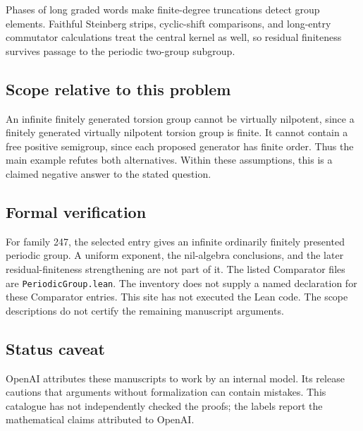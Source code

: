 \documentclass[11pt]{article}
\begin{document}
Phases of long graded words make finite-degree truncations detect group elements. Faithful Steinberg strips, cyclic-shift comparisons, and long-entry commutator calculations treat the central kernel as well, so residual finiteness survives passage to the periodic two-group subgroup.

\subsection{Scope relative to this problem}
An infinite finitely generated torsion group cannot be virtually nilpotent, since a finitely generated virtually nilpotent torsion group is finite. It cannot contain a free positive semigroup, since each proposed generator has finite order. Thus the main example refutes both alternatives. Within these assumptions, this is a claimed negative answer to the stated question.

\subsection{Formal verification}
For family 247, the selected entry gives an infinite ordinarily finitely presented periodic group. A uniform exponent, the nil-algebra conclusions, and the later residual-finiteness strengthening are not part of it. The listed Comparator files are \texttt{PeriodicGroup.lean}. The inventory does not supply a named declaration for these Comparator entries. This site has not executed the Lean code. The scope descriptions do not certify the remaining manuscript arguments.

\subsection{Status caveat}
OpenAI attributes these manuscripts to work by an internal model. Its release cautions that arguments without formalization can contain mistakes. This catalogue has not independently checked the proofs; the labels report the mathematical claims attributed to OpenAI.
\end{document}
